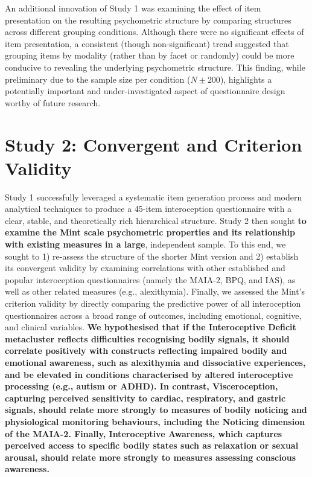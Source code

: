 \documentclass[
  man,
  floatsintext,
  longtable,
  nolmodern,
  notxfonts,
  notimes,
  mask,
  colorlinks=true,linkcolor=blue,citecolor=blue,urlcolor=blue]{apa7}
\begin{document}
An additional innovation of Study 1 was examining the effect of item
presentation on the resulting psychometric structure by comparing
structures across different grouping conditions. Although there were no
significant effects of item presentation, a consistent (though
non-significant) trend suggested that grouping items by modality (rather
than by facet or randomly) could be more conducive to revealing the
underlying psychometric structure. This finding, while preliminary due
to the sample size per condition (\(N \pm 200\)), highlights a
potentially important and under-investigated aspect of questionnaire
design worthy of future research.

\section{Study 2: Convergent and Criterion
Validity}\label{study-2-convergent-and-criterion-validity}

Study 1 successfully leveraged a systematic item generation process and
modern analytical techniques to produce a 45-item interoception
questionnaire with a clear, stable, and theoretically rich hierarchical
structure. Study 2 then sought \textbf{to examine the Mint scale
psychometric properties and its relationship with existing measures in a
large}, independent sample. To this end, we sought to 1) re-assess the
structure of the shorter Mint version and 2) establish its convergent
validity by examining correlations with other established and popular
interoception questionnaires (namely the MAIA-2, BPQ, and IAS), as well
as other related measures (e.g., alexithymia). Finally, we assessed the
Mint's criterion validity by directly comparing the predictive power of
all interoception questionnaires across a broad range of outcomes,
including emotional, cognitive, and clinical variables. \textbf{We
hypothesised that if the Interoceptive Deficit metacluster reflects
difficulties recognising bodily signals, it should correlate positively
with constructs reflecting impaired bodily and emotional awareness, such
as alexithymia and dissociative experiences, and be elevated in
conditions characterised by altered interoceptive processing (e.g.,
autism or ADHD). In contrast, Visceroception, capturing perceived
sensitivity to cardiac, respiratory, and gastric signals, should relate
more strongly to measures of bodily noticing and physiological
monitoring behaviours, including the Noticing dimension of the MAIA-2.
Finally, Interoceptive Awareness, which captures perceived access to
specific bodily states such as relaxation or sexual arousal, should
relate more strongly to measures assessing conscious awareness.}
\end{document}
